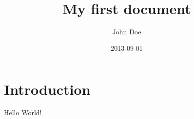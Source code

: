 \documentclass{article}
\title{My first document}
\date{2013-09-01}
\author{John Doe}
\begin{document}
  \maketitle
  \newpage
  \tableofcontents
  \section{Introduction}
  Hello World!
\end{document}
